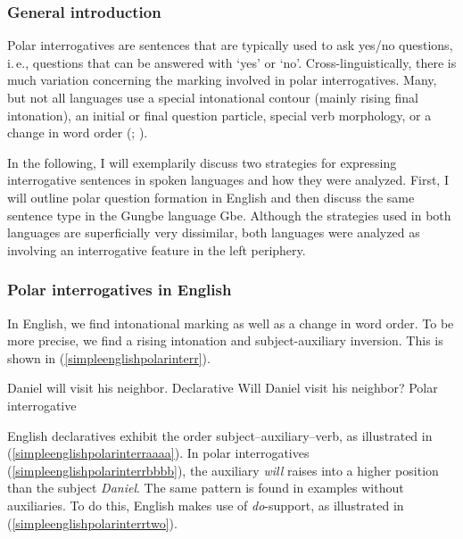 \subsubsection{General introduction}
Polar interrogatives are sentences that are typically used to ask yes/no questions, i.\,e., questions that can be answered with `yes' or `no'. Cross-linguistically, there is much variation concerning the marking involved in polar interrogatives. Many, but not all languages use a special intonational contour (mainly rising final intonation), an initial or final question particle, special verb morphology, or a change in word order (\citealt[181--182]{sadock1985speech}; \citealt{dryer2013questions}). 

In the following, I will exemplarily discuss two strategies for expressing interrogative sentences in spoken languages and how they were analyzed. First, I will outline polar question formation in English and then discuss the same sentence type in the Gungbe language Gbe. Although the strategies used in both languages are superficially very dissimilar, both languages were analyzed as involving an interrogative feature in the left periphery.

\subsubsection{Polar interrogatives in English}

In English, we find intonational marking as well as a change in word order. To be more precise, we find a rising intonation and subject-auxiliary inversion. This is shown in (\ref{simpleenglishpolarinterr}).

\begin{exe}
\ex\label{simpleenglishpolarinterr}\begin{xlist}
\ex Daniel will visit his neighbor. \hfill Declarative\label{simpleenglishpolarinterraaaa}
\ex Will Daniel visit his neighbor? \hfill Polar interrogative\label{simpleenglishpolarinterrbbbb}
\end{xlist}
\end{exe} 

\noindent English declaratives exhibit the order subject--auxiliary--verb, as illustrated in (\ref{simpleenglishpolarinterraaaa}). In polar interrogatives (\ref{simpleenglishpolarinterrbbbb}), the auxiliary \textit{will} raises into a higher position than the subject \textit{Daniel}. The same pattern is found in examples without auxiliaries. To do this, English makes use of \textit{do}-support, as illustrated in (\ref{simpleenglishpolarinterrtwo}).

